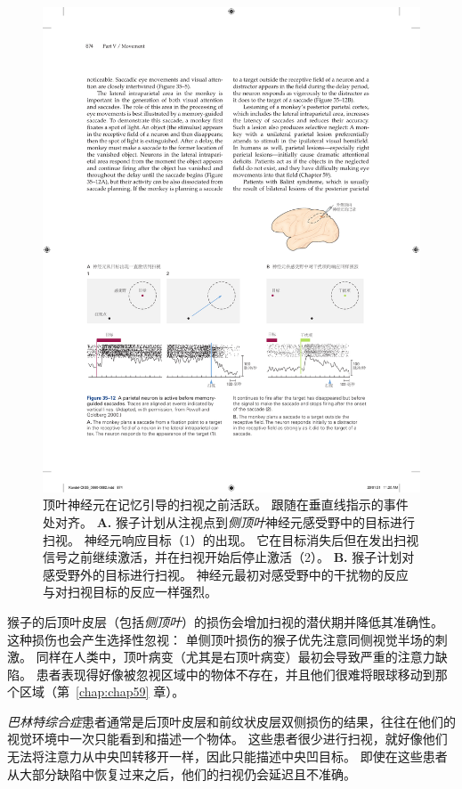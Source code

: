 \begin{figure}[htbp]
	\centering
	\includegraphics[width=1.0\linewidth]{chap35/fig_35_12}
	\caption{顶叶神经元在记忆引导的扫视之前活跃。
		跟随在垂直线指示的事件处对齐\cite{powell2000response}。
		\textbf{A.} 猴子计划从注视点到\textit{侧顶叶}神经元感受野中的目标进行扫视。
		神经元响应目标（1）的出现。
		它在目标消失后但在发出扫视信号之前继续激活，并在扫视开始后停止激活（2）。
		\textbf{B.} 猴子计划对感受野外的目标进行扫视。
		神经元最初对感受野中的干扰物的反应与对扫视目标的反应一样强烈。}
	\label{fig:35_12}
\end{figure}



猴子的后顶叶皮层（包括\textit{侧顶叶}）的损伤会增加扫视的潜伏期并降低其准确性。
这种损伤也会产生选择性忽视：
单侧顶叶损伤的猴子优先注意同侧视觉半场的刺激。
同样在人类中，顶叶病变（尤其是右顶叶病变）最初会导致严重的注意力缺陷。
患者表现得好像被忽视区域中的物体不存在，并且他们很难将眼球移动到那个区域（第~\ref{chap:chap59} 章）。


\textit{巴林特综合症}患者通常是后顶叶皮层和前纹状皮层双侧损伤的结果，往往在他们的视觉环境中一次只能看到和描述一个物体。
这些患者很少进行扫视，就好像他们无法将注意力从中央凹转移开一样，因此只能描述中央凹目标。
即使在这些患者从大部分缺陷中恢复过来之后，他们的扫视仍会延迟且不准确。


